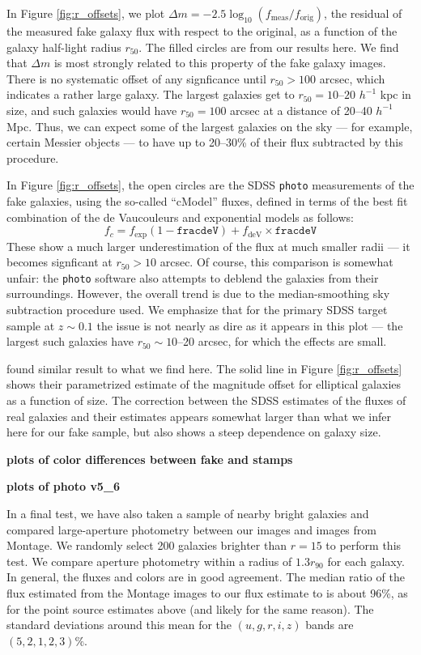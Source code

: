 \documentclass[10pt,preprint]{aastex}
\begin{document}
In Figure \ref{fig:r_offsets}, we plot $\Delta m =
-2.5\log_{10}(f_{\mathrm{meas}}/f_{\mathrm{orig}})$, the residual of
the measured fake galaxy flux with respect to the original, as a
function of the galaxy half-light radius $r_{50}$.  The filled circles
are from our results here. We find that $\Delta m$ is most strongly
related to this property of the fake galaxy images. There is no
systematic offset of any signficance until $r_{50}>100$ arcsec, which
indicates a rather large galaxy. The largest galaxies get to $r_{50}=
10$--$20$ $h^{-1}$ kpc in size, and such galaxies would have $r_{50} =
100$ arcsec at a distance of 20--40 $h^{-1}$ Mpc. Thus, we can expect
some of the largest galaxies on the sky --- for example, certain
Messier objects --- to have up to 20--30\% of their flux subtracted by
this procedure.

In Figure \ref{fig:r_offsets}, the open circles are the SDSS {\tt photo}
measurements of the fake galaxies, using the so-called ``cModel''
fluxes, defined in terms of the best fit combination of the de
Vaucouleurs and exponential models as follows:
\begin{equation}
 f_c = f_{\mathrm{exp}} \left(1-\mathtt{fracdeV}\right) +
 f_{\mathrm{deV}}
 \times \mathtt{fracdeV}
\end{equation}
These show a much larger
underestimation of the flux at much smaller radii --- it becomes
signficant at $r_{50}>10$ arcsec. Of course, this comparison is
somewhat unfair: the {\tt photo} software also attempts to deblend the
galaxies from their surroundings. However, the overall trend is due
to the median-smoothing sky subtraction procedure used.  We emphasize
that for the primary SDSS target sample at $z\sim 0.1$ 
the issue is not nearly as dire as it appears in this plot --- the
largest such galaxies have $r_{50}\sim 10$--20 arcsec, for which the
effects are small. 

\citet{hyde09a} found similar result to what we find here. The solid
line in Figure \ref{fig:r_offsets} shows their parametrized estimate
of the magnitude offset for elliptical galaxies as a function of
size. The correction between the SDSS estimates of the fluxes of real
galaxies and their estimates appears somewhat larger than what we
infer here for our fake sample, but also shows a steep dependence on
galaxy size.

{\bf plots of color differences between fake and stamps}

{\bf plots of photo v5\_6}

In a final test, we have also taken a sample of nearby bright galaxies 
and compared large-aperture photometry between our images and images
from Montage. We randomly select 200 galaxies brighter than $r=15$ to
perform this test. We compare aperture photometry within a radius of
$1.3 r_{90}$ for each galaxy. In general, the fluxes and colors are in
good agreement. The median ratio of the flux estimated from the
Montage images to our flux estimate to is about 96\%, as for the point
source estimates above (and likely for the same reason). The standard
deviations around this mean for the $(u,g,r,i,z)$ bands are
$(5,2,1,2,3)\%$.  
\end{document}
